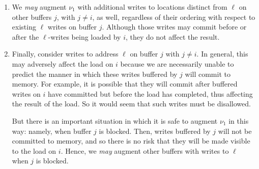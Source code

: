 \documentclass[11pt]{report}         %
\begin{document}
\begin{enumerate}
  \item We \emph{may} augment $\nu_1$ with additional writes to locations distinct from $\ell$ on other buffers $j$, with $j \neq i$, as well, regardless of their ordering with respect to existing $\ell$ writes on buffer $j$. Although those writes may commit before or after the $\ell$-writes being loaded by $i$, they do not affect the result. 
  
  \item Finally, consider writes to address $\ell$ on buffer $j$ with $j \neq i$. In general, this may adversely affect the load on $i$ because we are necessarily unable to predict the manner in which these writes buffered by $j$ will commit to memory. For example, it is possible that they will commit after buffered writes on $i$ have committed but before the load has completed, thus affecting the result of the load. So it would seem that such writes must be disallowed. 
  
  But there is an important situation in which it is safe to augment $\nu_1$ in this way: namely, when buffer $j$ is blocked. Then, writes buffered by $j$ will not be committed to memory, and so there is no risk that they will be made visible to the load on $i$. Hence, we \emph{may} augment other buffers with writes to $\ell$ when $j$ is blocked. 

\end{enumerate}
\end{document}
